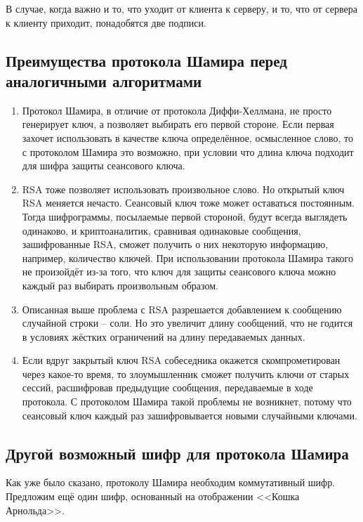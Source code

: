 В случае, когда важно и то, что уходит от клиента к серверу, и то, что от сервера к клиенту приходит, понадобятся две подписи. 
\subsection{Преимущества протокола Шамира перед аналогичными алгоритмами}
\begin{enumerate}
	\item Протокол Шамира, в отличие от протокола Диффи-Хеллмана, не просто генерирует ключ, а позволяет выбирать его первой стороне. Если первая захочет использовать в качестве ключа определённое, осмысленное слово, то с протоколом Шамира это возможно, при условии что длина ключа подходит для шифра защиты сеансового ключа.
	\item RSA тоже позволяет использовать произвольное слово. Но открытый ключ RSA меняется нечасто. Сеансовый ключ тоже может оставаться постоянным. Тогда шифрограммы, посылаемые первой стороной, будут всегда выглядеть одинаково, и криптоаналитик, сравнивая одинаковые сообщения, зашифрованные RSA, сможет получить о них некоторую информацию, например, количество ключей. При использовании протокола Шамира такого не произойдёт из-за того, что ключ для защиты сеансового ключа можно каждый раз выбирать произвольным образом.
	\item Описанная выше проблема с RSA разрешается добавлением к сообщению случайной строки – соли. Но это увеличит длину сообщений, что не годится в условиях жёстких ограничений на длину передаваемых данных.
	\item Если вдруг закрытый ключ RSA собеседника окажется скомпрометирован через какое-то время, то злоумышленник сможет получить ключи от старых сессий, расшифровав предыдущие сообщения, передаваемые в ходе протокола. С протоколом Шамира такой проблемы не возникнет, потому что сеансовый ключ каждый раз зашифровывается новыми случайными ключами.
\end{enumerate}
\subsection{Другой возможный шифр для протокола Шамира}
Как уже было сказано, протоколу Шамира необходим коммутативный шифр. Предложим ещё один шифр, основанный на отображении <<Кошка Арнольда>>.

